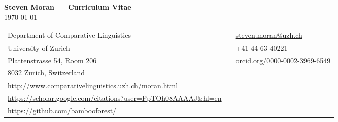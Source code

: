 \documentclass[11pt]{article}
\begin{document}
\pagestyle{empty}


\begin{center}
{\large \bf Steven Moran --- Curriculum Vitae}\\
\today\\

\vskip 12pt
\begin{tabular}{lll}
Department of Comparative Linguistics & & \href{mailto:steven.moran@uzh.ch}{steven.moran@uzh.ch} \\
University of Zurich & & +41 44 63 40221 \\
Plattenstrasse 54, Room 206 & & \small\url{orcid.org/0000-0002-3969-6549} \\
8032 Zurich, Switzerland & & \\
\small\url{http://www.comparativelinguistics.uzh.ch/moran.html} & & \\
\small\url{https://scholar.google.com/citations?user=PpTOh08AAAAJ&hl=en} & & \\
\small\url{https://github.com/bambooforest/} & & \
\end{tabular}
\end{center}

% 

\begin{comment}
\vskip 12pt
\begin{tabular}{lll}
Birthdate: 09.09.1979 && \\
Marital status: Single && \\
Nationality: USA && \\
Email: stiv@uw.edu && \\
Department of Linguistics & &\\
University of Washington & &\\
Box 354340 && \\
Seattle, WA 98195--4340 & & \\
\end{tabular}
\end{center}
\end{comment}
\end{document}
